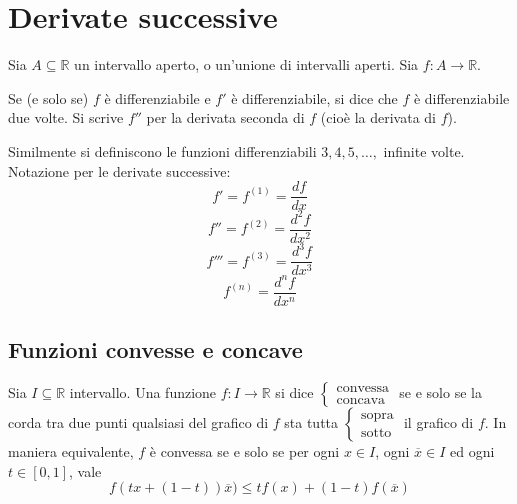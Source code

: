\documentclass[a4paper]{article}
\theoremstyle{break}
\theoremstyle{break}
\theoremstyle{break}
\theoremstyle{break}
\begin{document}
\section{Derivate successive}
Sia \( A \subseteq \mathbb{R} \) un intervallo aperto, o un'unione di intervalli aperti.
Sia \( f: A \to \mathbb{R} \).

Se (e solo se) \( f \) è differenziabile e \( f' \) è differenziabile, si dice
che \( f \) è differenziabile due volte. Si scrive \( f'' \) per la derivata seconda di
\( f \) (cioè la derivata di \( f \)).

Similmente si definiscono le funzioni differenziabili \( 3,4,5, \ldots, \) infinite volte.
Notazione per le derivate successive:
\[
f' = f^{(1)} = \frac{df}{dx}
\] 
\[
f'' = f^{(2)} = \frac{d^2f}{dx^2}
\] 
\[
f''' = f^{(3)} = \frac{d^3f}{dx^3}
\] 
\[
f^{(n)} = \frac{d^nf}{dx^n}
\] 
\subsection{Funzioni convesse e concave}
Sia \( I \subseteq \mathbb{R} \) intervallo. Una funzione \( f: I \to \mathbb{R} \)
si dice \( \begin{cases}
  \text{convessa}\\
  \text{concava}
\end{cases} \) se e solo se la corda tra due punti qualsiasi del grafico di \( f \) sta
tutta \( \begin{cases}
  \text{sopra}\\
  \text{sotto}
\end{cases} \) il grafico di \( f \). 
\label{D5}
\label{D6}
In maniera equivalente, \( f \) è convessa se e solo se per ogni \( x \in I \), ogni
\( \overline{x} \in I \) ed ogni \( t \in [0,1] \), vale
\[
f(tx+(1-t))\overline{x}) \le tf(x) + (1-t)f(\overline{x})
\] 
\end{document}
